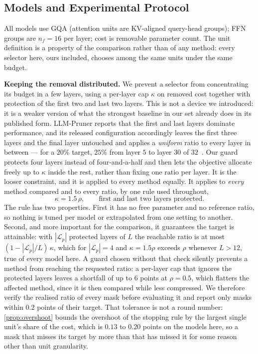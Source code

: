 \subsection{Models and Experimental Protocol}

\label{app:protocol}
All models use GQA (attention units are KV-aligned query-head groups); FFN groups are $n_f{=}16$ per
layer; cost is removable parameter count. The unit definition is a property of the comparison rather
than of any method: every selector here, ours included, chooses among the same units under the same
budget.

\textbf{Keeping the removal distributed.} We prevent a selector from concentrating its budget in a few
layers, using a per-layer cap $\kappa$ on removed cost together with protection of the first two and last
two layers. This is not a device we introduced: it is a weaker version of what the strongest baseline in
our set already does in its published form. LLM-Pruner reports that the first and last layers dominate
performance, and its released configuration accordingly leaves the first three layers and the final layer
untouched and applies a \emph{uniform} ratio to every layer in between --- for a $20\%$ target, $25\%$
from layer $5$ to layer $30$ of $32$~\citep{ma2023llmpruner}. Our guard protects four layers instead of
four-and-a-half and then lets the objective allocate freely up to $\kappa$ inside the rest, rather than
fixing one ratio per layer. It is the looser constraint, and it is applied to every method equally. It applies to \emph{every} method compared and to
every ratio, by one rule used throughout,
\[
\kappa = 1.5\,\rho ,\qquad \text{first and last two layers protected}.
\]
The rule has two properties. First it has no free parameter and no reference
ratio, so nothing is tuned per model or extrapolated from one setting to another. Second, and more
important for the comparison, it guarantees the target is attainable: with $|\mathcal L_p|$ protected layers of $L$
the reachable ratio is at most $(1-|\mathcal L_p|/L)\,\kappa$, which for $|\mathcal L_p|{=}4$ and $\kappa{=}1.5\rho$ exceeds $\rho$
whenever $L>12$, true of every model here. A guard chosen without that check silently prevents a
method from reaching the requested ratio: a per-layer cap that ignores the protected layers leaves a
shortfall of up to $6$ points at $\rho{=}0.5$, which flatters the affected method, since it is then
compared while less compressed. We therefore verify the realised ratio of every mask before evaluating
it and report only masks within $0.2$ points of their target. That tolerance is not a round number:
\cref{prop:overshoot} bounds the overshoot of the stopping rule by the largest single unit's share of
the cost, which is $0.13$ to $0.20$ points on the models here, so a mask that misses its target by more
than that has missed it for some reason other than unit granularity.


